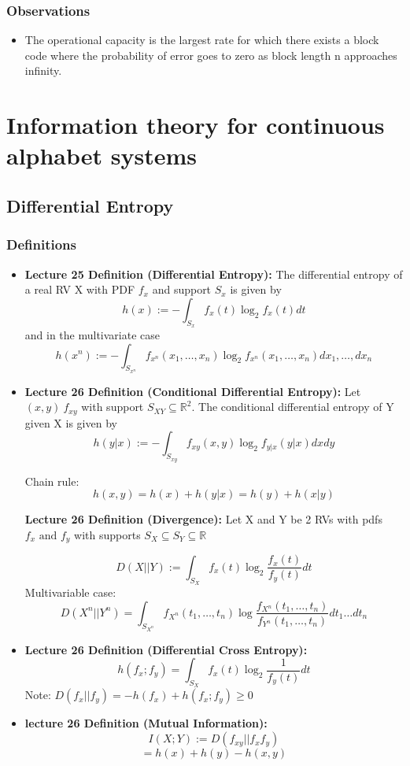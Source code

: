 \documentclass{article}
\begin{document}
\subsubsection{Observations}
\begin{itemize}
    \item The operational capacity is the largest rate for which there exists a block code where the probability of error goes to zero as block length n approaches infinity.
\end{itemize}

\section{Information theory for continuous alphabet systems}
\subsection{Differential Entropy}
\subsubsection{Definitions}
\begin{itemize}
    \item \textbf{Lecture 25 Definition (Differential Entropy):}
    The differential entropy of a real RV X with PDF \(f_x\) and support \(S_x\) is given by
    \[h(x) := -\int_{S_x}f_x(t)\log_2 f_x(t)dt\]
    and in the multivariate case
    \[h(x^n):=-\int_{S_{x^n}}f_{x^n}(x_1, \ldots, x_n)\log_2 f_{x^n}(x_1, \ldots, x_n)dx_1, \ldots, dx_n\]
    \item \textbf{Lecture 26 Definition (Conditional Differential Entropy):}
    Let \((x,y)~f_{xy}\) with support \(S_{XY} \subseteq \mathbb{R}^2\). The conditional differential entropy of Y given X is given by 
    \[h(y|x) := -\int_{S_{xy}} f_{xy}(x,y) \log_2 f_{y|x}(y|x) dx dy\]

    Chain rule:
    \[h(x,y) = h(x) + h(y|x) = h(y) + h(x|y)\]

    \textbf{Lecture 26 Definition (Divergence):}
    Let X and Y be 2 RVs with pdfs \(f_x \text{ and } f_y\) with supports \(S_X \subseteq S_Y \subseteq \mathbb{R}\)

    \[D(X||Y):= \int_{S_X} f_x(t) \log_2 \frac{f_x(t)}{f_y(t)} dt\]
    Multivariable case:
    \[D(X^n||Y^n) = \int_{S_{X^n}} f_{X^n}(t_1, \ldots, t_n) \log \frac{f_{X^n}(t_1, \ldots, t_n)}{f_{Y^n}(t_1, \ldots, t_n)}dt_1 \ldots dt_n\]

    \item \textbf{Lecture 26 Definition (Differential Cross Entropy):}
    \[h(f_x;f_y) = \int_{S_X} f_x(t) \log_2 \frac{1}{f_y(t)}dt\]
    Note: \(D(f_x||f_y) = -h(f_x) + h(f_x;f_y) \geq 0\)

    \item \textbf{lecture 26 Definition (Mutual Information):}
    \[I(X;Y):= D(f_{xy}||f_x f_y)\]
    \[= h(x) + h(y) - h(x,y)\]
\end{itemize}
\end{document}
